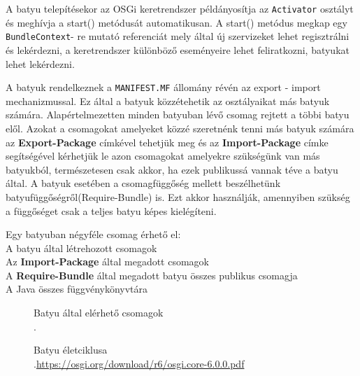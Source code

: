 A batyu telepítésekor az OSGi keretrendszer példányosítja az \texttt{Activator} osztályt és meghívja a start() metódusát automatikusan. A start() metódus megkap egy \texttt{BundleContext}- re mutató referenciát mely által új szervizeket lehet regisztrálni és lekérdezni, a keretrendszer különböző eseményeire lehet feliratkozni, batyukat lehet lekérdezni.

A batyuk rendelkeznek a \texttt{MANIFEST.MF} állomány révén az export - import mechanizmussal. Ez által a batyuk közzétehetik az osztályaikat más batyuk számára. Alapértelmezetten minden batyuban lévő csomag rejtett a többi batyu elől. Azokat a csomagokat amelyeket közzé szeretnénk tenni más batyuk számára az \textbf{Export-Package} címkével tehetjük meg és az \textbf{Import-Package} címke segítségével kérhetjük le azon csomagokat amelyekre szükségünk van más batyukból, természetesen csak akkor, ha ezek publikussá vannak téve a batyu által. A batyuk esetében a csomagfüggőség mellett beszélhetünk batyufüggőségről(Require-Bundle) is. Ezt akkor használják, amennyiben szükség a függőséget csak a teljes batyu képes kielégíteni.

Egy batyuban négyféle csomag érhető el:
\\A batyu által létrehozott csomagok
\\Az \textbf{Import-Package} által megadott csomagok
\\A \textbf{Require-Bundle} által megadott batyu összes publikus csomagja
\\A Java összes függvénykönyvtára

\begin{figure}[t]
  \centering
  \caption[Batyuk elerese]%
  {Batyu által elérhető csomagok\\
  {\white .}\hfill\url{}}
  \label{fig:ALAP:sm1}
\end{figure}

\begin{figure}[t]
  \centering
  \caption[Batyuk eletciklusa]%
  {Batyu életciklusa\\
  {\white .}\hfill\url{https://osgi.org/download/r6/osgi.core-6.0.0.pdf}}
  \label{fig:ALAP:sm1}
\end{figure}

